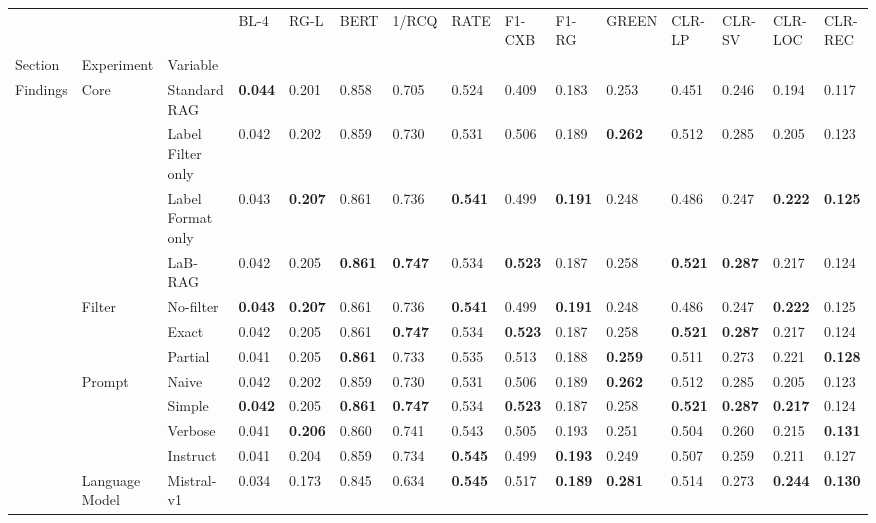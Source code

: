 \begin{tabular}{lllllllllllllll}
\toprule
 &  &  & BL-4 & RG-L & BERT & 1/RCQ & RATE & F1-CXB & F1-RG & GREEN & CLR-LP & CLR-SV & CLR-LOC & CLR-REC \\
Section & Experiment & Variable &  &  &  &  &  &  &  &  &  &  &  &  \\
\midrule
\multirow[c]{27}{*}{Findings} & \multirow[c]{4}{*}{Core} & Standard RAG & \textbf{0.044} & 0.201 & 0.858 & 0.705 & 0.524 & 0.409 & 0.183 & 0.253 & 0.451 & 0.246 & 0.194 & 0.117 \\
 &  & Label Filter only & 0.042 & 0.202 & 0.859 & 0.730 & 0.531 & 0.506 & 0.189 & \textbf{0.262} & 0.512 & 0.285 & 0.205 & 0.123 \\
 &  & Label Format only & 0.043 & \textbf{0.207} & 0.861 & 0.736 & \textbf{0.541} & 0.499 & \textbf{0.191} & 0.248 & 0.486 & 0.247 & \textbf{0.222} & \textbf{0.125} \\
 &  & LaB-RAG & 0.042 & 0.205 & \textbf{0.861} & \textbf{0.747} & 0.534 & \textbf{0.523} & 0.187 & 0.258 & \textbf{0.521} & \textbf{0.287} & 0.217 & 0.124 \\
\cmidrule{2-15}
 & \multirow[c]{3}{*}{Filter} & No-filter & \textbf{0.043} & \textbf{0.207} & 0.861 & 0.736 & \textbf{0.541} & 0.499 & \textbf{0.191} & 0.248 & 0.486 & 0.247 & \textbf{0.222} & 0.125 \\
 &  & Exact & 0.042 & 0.205 & 0.861 & \textbf{0.747} & 0.534 & \textbf{0.523} & 0.187 & 0.258 & \textbf{0.521} & \textbf{0.287} & 0.217 & 0.124 \\
 &  & Partial & 0.041 & 0.205 & \textbf{0.861} & 0.733 & 0.535 & 0.513 & 0.188 & \textbf{0.259} & 0.511 & 0.273 & 0.221 & \textbf{0.128} \\
\cmidrule{2-15}
 & \multirow[c]{4}{*}{Prompt} & Naive & 0.042 & 0.202 & 0.859 & 0.730 & 0.531 & 0.506 & 0.189 & \textbf{0.262} & 0.512 & 0.285 & 0.205 & 0.123 \\
 &  & Simple & \textbf{0.042} & 0.205 & \textbf{0.861} & \textbf{0.747} & 0.534 & \textbf{0.523} & 0.187 & 0.258 & \textbf{0.521} & \textbf{0.287} & \textbf{0.217} & 0.124 \\
 &  & Verbose & 0.041 & \textbf{0.206} & 0.860 & 0.741 & 0.543 & 0.505 & 0.193 & 0.251 & 0.504 & 0.260 & 0.215 & \textbf{0.131} \\
 &  & Instruct & 0.041 & 0.204 & 0.859 & 0.734 & \textbf{0.545} & 0.499 & \textbf{0.193} & 0.249 & 0.507 & 0.259 & 0.211 & 0.127 \\
\cmidrule{2-15}
 & \multirow[c]{3}{*}{Language Model} & Mistral-v1 & 0.034 & 0.173 & 0.845 & 0.634 & \textbf{0.545} & 0.517 & \textbf{0.189} & \textbf{0.281} & 0.514 & 0.273 & \textbf{0.244} & \textbf{0.130} \\

\end{tabular}
